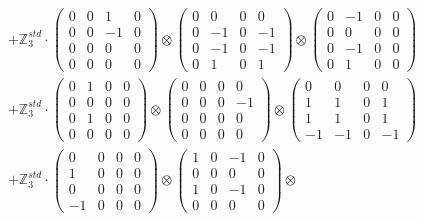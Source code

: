 \documentclass{article}
\begin{document}
{\begin{align}
        &+ \label{Rs16-Rc11-Solution-22-c22} \mathbb{Z}_3^{std} \cdot 
            \begin{pmatrix} 0 & 0 & 1 & 0 \\ 0 & 0 & -1 & 0 \\ 0 & 0 & 0 & 0 \\ 0 & 0 & 0 & 0 \end{pmatrix} \otimes 
            \begin{pmatrix} 0 & 0 & 0 & 0 \\ 0 & -1 & 0 & -1 \\ 0 & -1 & 0 & -1 \\ 0 & 1 & 0 & 1 \end{pmatrix} \otimes 
            \begin{pmatrix} 0 & -1 & 0 & 0 \\ 0 & 0 & 0 & 0 \\ 0 & -1 & 0 & 0 \\ 0 & 1 & 0 & 0 \end{pmatrix} \\ 
        &+ \label{Rs16-Rc11-Solution-22-c23} \mathbb{Z}_3^{std} \cdot 
            \begin{pmatrix} 0 & 1 & 0 & 0 \\ 0 & 0 & 0 & 0 \\ 0 & 1 & 0 & 0 \\ 0 & 0 & 0 & 0 \end{pmatrix} \otimes 
            \begin{pmatrix} 0 & 0 & 0 & 0 \\ 0 & 0 & 0 & -1 \\ 0 & 0 & 0 & 0 \\ 0 & 0 & 0 & 0 \end{pmatrix} \otimes 
            \begin{pmatrix} 0 & 0 & 0 & 0 \\ 1 & 1 & 0 & 1 \\ 1 & 1 & 0 & 1 \\ -1 & -1 & 0 & -1 \end{pmatrix} \\ 
        &+ \label{Rs16-Rc11-Solution-22-c24} \mathbb{Z}_3^{std} \cdot 
            \begin{pmatrix} 0 & 0 & 0 & 0 \\ 1 & 0 & 0 & 0 \\ 0 & 0 & 0 & 0 \\ -1 & 0 & 0 & 0 \end{pmatrix} \otimes 
            \begin{pmatrix} 1 & 0 & -1 & 0 \\ 0 & 0 & 0 & 0 \\ 1 & 0 & -1 & 0 \\ 0 & 0 & 0 & 0 \end{pmatrix} \otimes 

\end{align}}
\end{document}
